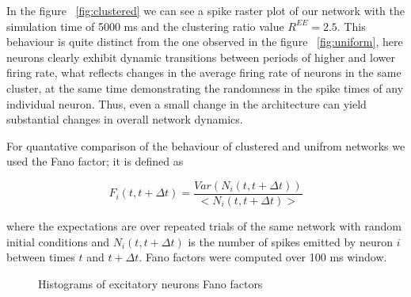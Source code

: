 \documentclass[11pt]{article}
\begin{document}
In the figure ~\ref{fig:clustered} we can see a spike raster plot of our network with the simulation time of 5000 ms and the clustering ratio value $R^{EE} = 2.5$. This behaviour is quite distinct from the one observed in the figure ~\ref{fig:uniform}, here neurons clearly exhibit dynamic transitions between periods of higher and lower firing rate, what reflects changes in the average firing rate of neurons in the same cluster, at the same time demonstrating the randomness in the spike times of any individual neuron. Thus, even a small change in the architecture can yield substantial changes in overall network dynamics.


For quantative comparison of the behaviour of clustered and unifrom networks we used the Fano factor; it is defined as

$$
F_i(t, t+\Delta t) = \frac{Var(N_i(t, t+\Delta t))}{<N_i(t, t+\Delta t)>}
$$

where the expectations are over repeated trials of the same network with random initial conditions and $N_i(t, t+\Delta t)$ is the number of spikes emitted by neuron $i$ between times $t$ and $t+\Delta t$. Fano factors were computed over 100 ms window.

\begin{figure}[h]
\begin{minipage}[h]{0.49\linewidth}
\end{minipage}
\hfill
\begin{minipage}[h]{0.49\linewidth}
\end{minipage}
\caption{Histograms of excitatory neurons Fano factors}
\label{fig:hist}
\end{figure}
\end{document}

